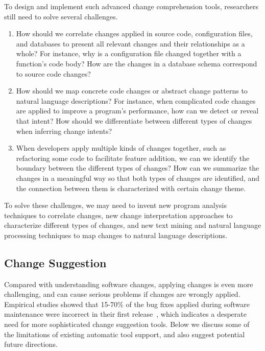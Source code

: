 To design and implement such advanced change comprehension tools, researchers still need to solve several challenges. 
\begin{enumerate}
\item How should we correlate changes applied in source code, configuration files, and databases to present all relevant changes and their relationships as a whole? For instance, why is a configuration file changed together with a function's code body? How are the changes in a database schema correspond to source code changes?
\item How should we map concrete code changes or abstract change patterns to natural language descriptions? For instance, when complicated code changes are applied to improve a program's  performance, how can we detect or reveal that intent? How should we differentiate between different types of changes when inferring change intents?
\item When developers apply multiple kinds of changes together, such as refactoring some code to facilitate feature addition, we can we identify the boundary between the different types of changes? How can we summarize the changes in a meaningful way so that both types of changes are identified, and the connection between them is characterized with certain change theme.
\end{enumerate}
To solve these challenges, we may need to invent new program analysis techniques to correlate changes, new change interpretation approaches to characterize different types of changes,
and new text mining and natural language processing techniques to map changes to natural language descriptions.

\subsection{Change Suggestion}
Compared with understanding software changes, applying changes is even more challenging, and can cause serious problems if changes are wrongly applied. Empirical studies showed that 15-70\% of the bug fixes applied during software maintenance were incorrect in their first release~\cite{Sidiroglou:2007:BP,Yin2011:FBB}, which indicates a desperate need for more sophisticated change suggestion tools. 
Below we discuss some of the limitations of existing automatic tool support, and also suggest potential future directions.


